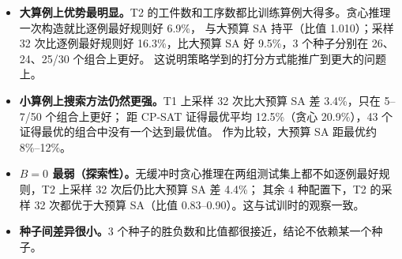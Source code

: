 \documentclass[11pt,a4paper]{ctexart}
\theoremstyle{definition}
\theoremstyle{remark}
\begin{document}
\begin{table}[ht]
\centering
\caption{学习型策略的 $C_{\max}$ 比值（3 个种子平均）}
\label{tab:l2}
\small
{}
\end{table}

\begin{itemize}[nosep]
  \item \textbf{大算例上优势最明显。}T2 的工件数和工序数都比训练算例大得多。贪心推理一次构造就比逐例最好规则好 6.9\%，
        与大预算 SA 持平（比值 1.010）；采样 32 次比逐例最好规则好 16.3\%，比大预算 SA 好 9.5\%，3 个种子分别在 26、24、25/30 个组合上更好。
        这说明策略学到的打分方式能推广到更大的问题上。
  \item \textbf{小算例上搜索方法仍然更强。}T1 上采样 32 次比大预算 SA 差 3.4\%，只在 5--7/50 个组合上更好；
        距 CP-SAT 证得最优平均 12.5\%（贪心 20.9\%），43 个证得最优的组合中没有一个达到最优值。
        作为比较，大预算 SA 距最优约 8\%--12\%。
  \item \textbf{$B=0$ 最弱（探索性）。}无缓冲时贪心推理在两组测试集上都不如逐例最好规则，T2 上采样 32 次后仍比大预算 SA 差 4.4\%；
        其余 4 种配置下，T2 的采样 32 次都优于大预算 SA（比值 0.83--0.90）。这与试训时的观察一致。
  \item \textbf{种子间差异很小。}3 个种子的胜负数和比值都很接近，结论不依赖某一个种子。
\end{itemize}
\end{document}
